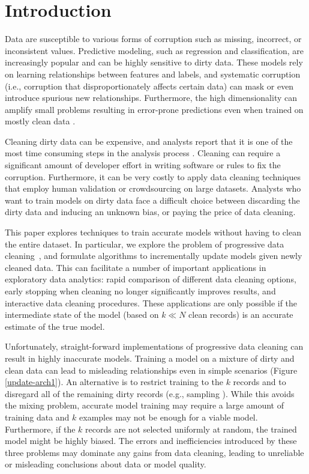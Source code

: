 \section{Introduction}
Data are susceptible to various forms of corruption such as missing, incorrect, or inconsistent values.
Predictive modeling, such as regression and classification, are increasingly popular \cite{bdas, alexandrov2014stratosphere, crotty2014tupleware, hellerstein2012madlib} and can be highly sensitive to dirty data.
These models rely on learning relationships between features and labels, and systematic corruption \cite{taylor1982introduction} (i.e., corruption that disproportionately affects certain data) can mask or even introduce spurious new relationships.
Furthermore, the high dimensionality can amplify small problems resulting in error-prone predictions even when trained on mostly clean data \cite{xiaofeature}.

Cleaning dirty data can be expensive, and analysts report that it is one of the most time consuming steps in the analysis process \cite{nytimes}.
Cleaning can require a significant amount of developer effort in writing software or rules to fix the corruption.
Furthermore, it can be very costly to apply data cleaning techniques that employ human validation or crowdsourcing on large datasets.
Analysts who want to train models on dirty data face a difficult choice between discarding the dirty data and inducing an unknown bias, or paying the price of data cleaning.

This paper explores techniques to train accurate models without having to clean the entire dataset.
In particular, we explore the problem of progressive data cleaning~\cite{altowim2014progressive, whang2014incremental, papenbrock2015progressive, gruenheid2014incremental, mayfield2010eracer, DBLP:journals/pvldb/YakoutENOI11, yakout2013don}, and formulate algorithms to incrementally update models given newly cleaned data.
This can facilitate a number of important applications in exploratory data analytics: rapid comparison of different data cleaning options, early stopping when cleaning no longer significantly improves results, and interactive data cleaning procedures.
These applications are only possible if the intermediate state of the model (based on $k \ll N$ clean records) is an accurate estimate of the true model.

Unfortunately, straight-forward implementations of progressive data cleaning can result in highly inaccurate models.
Training a model on a mixture of dirty and clean data can lead to misleading relationships even in simple scenarios (Figure \ref{update-arch1}).
An alternative is to restrict training to the $k$ records and to disregard all of the remaining dirty records (e.g., sampling \cite{wang1999sample}).
While this avoids the mixing problem, accurate model training may require a large amount of training data and $k$ examples may not be enough for a viable model.
Furthermore, if the $k$ records are not selected uniformly at random, the trained model might be highly biased.
The errors and inefficiencies introduced by these three problems may dominate any gains from data cleaning, leading to unreliable or misleading conclusions about data or model quality.

